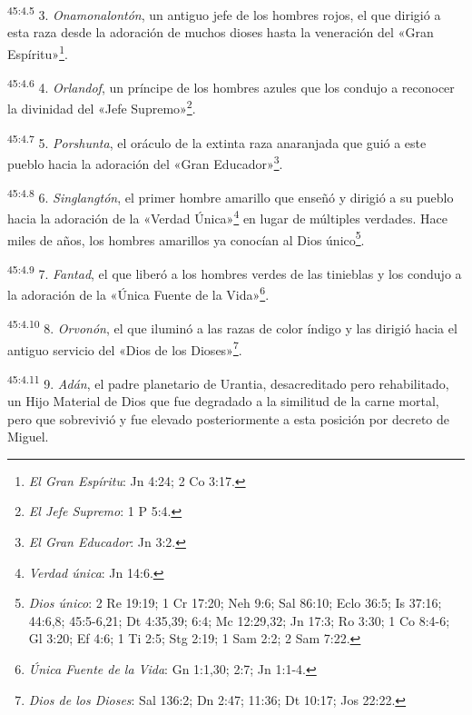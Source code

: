 \par
\textsuperscript{45:4.5} 3. \textit{Onamonalontón}, un antiguo jefe de los hombres rojos, el que dirigió a esta raza desde la adoración de muchos dioses hasta la veneración del «Gran Espíritu»\footnote{\textit{El Gran Espíritu}: Jn 4:24; 2 Co 3:17.}.

\par
\textsuperscript{45:4.6} 4. \textit{Orlandof}, un príncipe de los hombres azules que los condujo a reconocer la divinidad del «Jefe Supremo»\footnote{\textit{El Jefe Supremo}: 1 P 5:4.}.

\par
\textsuperscript{45:4.7} 5. \textit{Porshunta}, el oráculo de la extinta raza anaranjada que guió a este pueblo hacia la adoración del «Gran Educador»\footnote{\textit{El Gran Educador}: Jn 3:2.}.

\par
\textsuperscript{45:4.8} 6. \textit{Singlangtón}, el primer hombre amarillo que enseñó y dirigió a su pueblo hacia la adoración de la «Verdad Única»\footnote{\textit{Verdad única}: Jn 14:6.} en lugar de múltiples verdades. Hace miles de años, los hombres amarillos ya conocían al Dios único\footnote{\textit{Dios único}: 2 Re 19:19; 1 Cr 17:20; Neh 9:6; Sal 86:10; Eclo 36:5; Is 37:16; 44:6,8; 45:5-6,21; Dt 4:35,39; 6:4; Mc 12:29,32; Jn 17:3; Ro 3:30; 1 Co 8:4-6; Gl 3:20; Ef 4:6; 1 Ti 2:5; Stg 2:19; 1 Sam 2:2; 2 Sam 7:22.}.

\par
\textsuperscript{45:4.9} 7. \textit{Fantad}, el que liberó a los hombres verdes de las tinieblas y los condujo a la adoración de la «Única Fuente de la Vida»\footnote{\textit{Única Fuente de la Vida}: Gn 1:1,30; 2:7; Jn 1:1-4.}.

\par
\textsuperscript{45:4.10} 8. \textit{Orvonón}, el que iluminó a las razas de color índigo y las dirigió hacia el antiguo servicio del «Dios de los Dioses»\footnote{\textit{Dios de los Dioses}: Sal 136:2; Dn 2:47; 11:36; Dt 10:17; Jos 22:22.}.

\par
\textsuperscript{45:4.11} 9. \textit{Adán}, el padre planetario de Urantia, desacreditado pero rehabilitado, un Hijo Material de Dios que fue degradado a la similitud de la carne mortal, pero que sobrevivió y fue elevado posteriormente a esta posición por decreto de Miguel.

